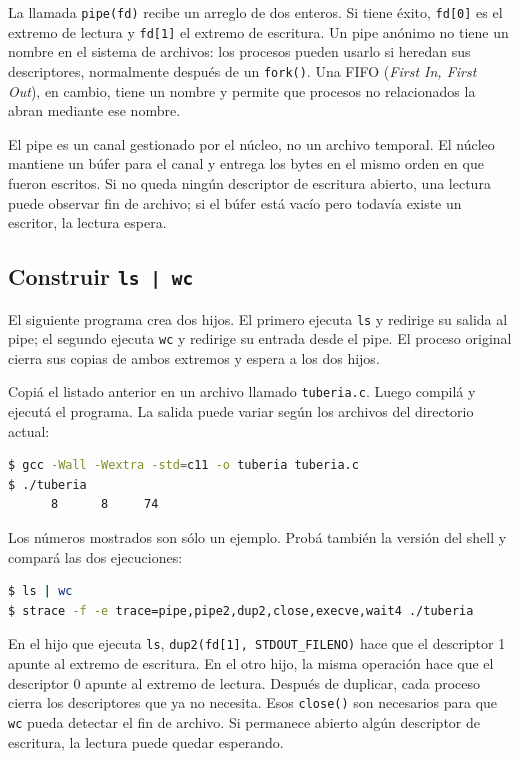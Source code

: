 \documentclass[11pt,a4paper]{article}
\newcommand{\inputcode}[2][]{%
  \par\addvspace{0.2\baselineskip}\noindent
  \begin{minipage}{\linewidth}
    
  \end{minipage}\par\addvspace{0.2\baselineskip}}
\begin{document}
La llamada \texttt{pipe(fd)} recibe un arreglo de dos enteros. Si tiene
éxito, \texttt{fd[0]} es el extremo de lectura y \texttt{fd[1]} el extremo de
escritura. Un pipe anónimo no tiene un nombre en el sistema de archivos: los
procesos pueden usarlo si heredan sus descriptores, normalmente después de un
\texttt{fork()}. Una FIFO (\emph{First In, First Out}), en cambio, tiene un
nombre y permite que procesos no relacionados la abran mediante ese nombre.

\begin{notebox}
El pipe es un canal gestionado por el núcleo, no un archivo temporal. El núcleo
mantiene un búfer para el canal y entrega los bytes en el mismo orden en que
fueron escritos. Si no queda ningún descriptor de escritura abierto, una
lectura puede observar fin de archivo; si el búfer está vacío pero todavía
existe un escritor, la lectura espera.
\end{notebox}

\subsection{Construir \texttt{ls | wc}}

El siguiente programa crea dos hijos. El primero ejecuta \texttt{ls} y redirige
su salida al pipe; el segundo ejecuta \texttt{wc} y redirige su entrada desde
el pipe. El proceso original cierra sus copias de ambos extremos y espera a
los dos hijos.

\clearpage
\enlargethispage{3pt}
\inputcode[language=C,basicstyle=\ttfamily\scriptsize]{../examples/tp5/tuberia.c}

Copiá el listado anterior en un archivo llamado \texttt{tuberia.c}. Luego
compilá y ejecutá el programa. La salida puede variar según los archivos del
directorio actual:

\begin{lstlisting}[language=bash]
$ gcc -Wall -Wextra -std=c11 -o tuberia tuberia.c
$ ./tuberia
      8      8     74
\end{lstlisting}

Los números mostrados son sólo un ejemplo. Probá también la versión del shell
y compará las dos ejecuciones:

\begin{lstlisting}[language=bash]
$ ls | wc
$ strace -f -e trace=pipe,pipe2,dup2,close,execve,wait4 ./tuberia
\end{lstlisting}

En el hijo que ejecuta \texttt{ls}, \texttt{dup2(fd[1], STDOUT\_FILENO)} hace
que el descriptor 1 apunte al extremo de escritura. En el otro hijo, la misma
operación hace que el descriptor 0 apunte al extremo de lectura. Después de
duplicar, cada proceso cierra los descriptores que ya no necesita. Esos
\texttt{close()} son necesarios para que \texttt{wc} pueda detectar el fin de
archivo. Si permanece abierto algún descriptor de escritura, la lectura puede
quedar esperando.
\end{document}
